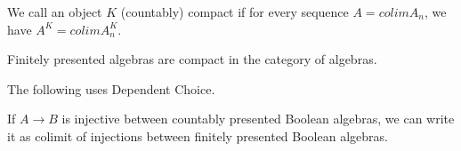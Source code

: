 \begin{definition}
  We call an object $K$ (countably) compact if for every sequence $A = colim A_n$, we have
  $A^K = colim A_n^K$.
\end{definition}

\begin{lemma}
  Finitely presented algebras are compact in the category of algebras. 
\end{lemma}  

 The following uses Dependent Choice.

\begin{lemma}
  If $A \to B$ is injective between countably presented Boolean algebras, 
  we can write it as colimit of injections between finitely presented Boolean algebras. 
\end{lemma}
